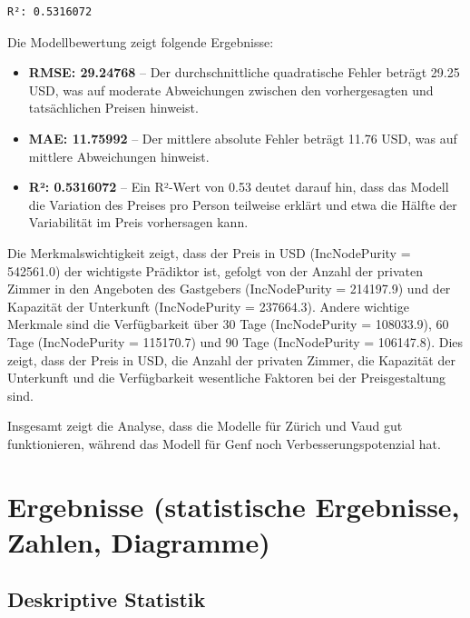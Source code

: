 \documentclass[
  journal,
]{IEEEtran}%
\begin{document}
\begin{verbatim}
R²: 0.5316072 
\end{verbatim}

Die Modellbewertung zeigt folgende Ergebnisse:

\begin{itemize}
\item
  \textbf{RMSE: 29.24768} -- Der durchschnittliche quadratische Fehler
  beträgt 29.25 USD, was auf moderate Abweichungen zwischen den
  vorhergesagten und tatsächlichen Preisen hinweist.
\item
  \textbf{MAE: 11.75992} -- Der mittlere absolute Fehler beträgt 11.76
  USD, was auf mittlere Abweichungen hinweist.
\item
  \textbf{R²: 0.5316072} -- Ein R²-Wert von 0.53 deutet darauf hin, dass
  das Modell die Variation des Preises pro Person teilweise erklärt und
  etwa die Hälfte der Variabilität im Preis vorhersagen kann.
\end{itemize}

Die Merkmalswichtigkeit zeigt, dass der Preis in USD (IncNodePurity =
542561.0) der wichtigste Prädiktor ist, gefolgt von der Anzahl der
privaten Zimmer in den Angeboten des Gastgebers (IncNodePurity =
214197.9) und der Kapazität der Unterkunft (IncNodePurity = 237664.3).
Andere wichtige Merkmale sind die Verfügbarkeit über 30 Tage
(IncNodePurity = 108033.9), 60 Tage (IncNodePurity = 115170.7) und 90
Tage (IncNodePurity = 106147.8). Dies zeigt, dass der Preis in USD, die
Anzahl der privaten Zimmer, die Kapazität der Unterkunft und die
Verfügbarkeit wesentliche Faktoren bei der Preisgestaltung sind.

Insgesamt zeigt die Analyse, dass die Modelle für Zürich und Vaud gut
funktionieren, während das Modell für Genf noch Verbesserungspotenzial
hat.

\hypertarget{ergebnisse-statistische-ergebnisse-zahlen-diagramme}{%
\section{Ergebnisse (statistische Ergebnisse, Zahlen,
Diagramme)}\label{ergebnisse-statistische-ergebnisse-zahlen-diagramme}}

\hypertarget{deskriptive-statistik-1}{%
\subsection{\texorpdfstring{\textbf{Deskriptive
Statistik}}{Deskriptive Statistik}}\label{deskriptive-statistik-1}}
\end{document}
